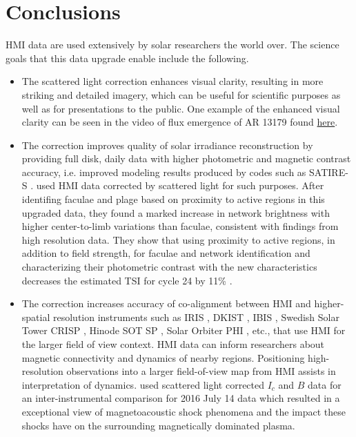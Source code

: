\documentclass[trackchanges]{aastex62}
\begin{document}
\section{Conclusions}\label{ref:sec5}
HMI data are used extensively by solar researchers the world over. The science goals that this data upgrade enable include the following.
\begin{itemize}
\item The scattered light correction enhances visual clarity, resulting in more striking and detailed imagery, which can be useful for scientific purposes as well as for presentations to the public. One example of the enhanced visual clarity can be seen in the video of flux emergence of AR 13179 found \href{https://vimeo.com/1096037326}{here}. 

\item The correction improves quality of solar irradiance reconstruction by providing full disk, daily data with higher photometric and magnetic contrast accuracy, i.e. improved modeling results produced by codes such as SATIRE-S \citep{yeo:2014}. \citet{criscuoli:2017} used HMI data corrected by scattered light for such purposes. After identifing faculae and plage based on proximity to active regions in this upgraded data, they found a marked increase in network brightness with higher center-to-limb variations than faculae, consistent with findings from high resolution data. They show that using proximity to active regions, in addition to field strength, for faculae and network identification and characterizing their photometric contrast with the new characteristics decreases the estimated TSI for cycle 24 by 11\% .  
\item The correction increases accuracy of co-alignment between HMI and higher-spatial resolution instruments such as IRIS \citep{depontieu:2014}, DKIST \citep{rimmele:2020}, IBIS \citep{cavallini:2006}, Swedish Solar Tower CRISP \citep{scharmer:2003}, Hinode SOT SP \citep{tsuneta:2008}, Solar Orbiter PHI \citep{solanki:2020}, etc., that use HMI for the larger field of view context. HMI data can inform researchers about magnetic connectivity and dynamics of nearby regions. Positioning high-resolution observations into a larger field-of-view map from HMI assists in interpretation of dynamics. \citet{houston:2018} used scattered light corrected $I_c$ and $B$ data for an inter-instrumental comparison for 2016 July 14 data which resulted in a exceptional view of magnetoacoustic shock phenomena and the impact these shocks have on the surrounding magnetically dominated plasma.


\end{itemize}
\end{document}
